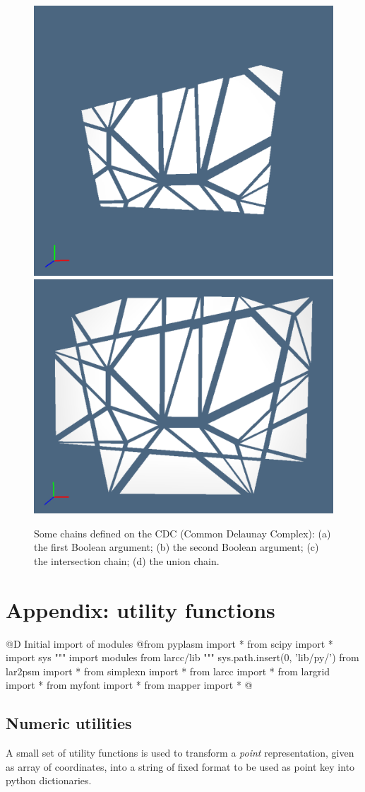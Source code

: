 \documentclass[11pt,oneside]{article}	%
\begin{document}
\begin{figure}[htbp]
   \includegraphics[height=0.2\linewidth,width=0.244\linewidth]{images/forks07} 
   \includegraphics[height=0.2\linewidth,width=0.244\linewidth]{images/forks08} 
   \caption{Some chains defined on the CDC (Common Delaunay Complex): (a) the first Boolean argument; (b) the second Boolean argument; (c) the intersection chain; (d) the union chain.}
   \label{fig:example}
\end{figure}


\appendix
\section{Appendix: utility functions}
@D Initial import of modules
@{from pyplasm import *
from scipy import *
import sys
""" import modules from larcc/lib """
sys.path.insert(0, 'lib/py/')
from lar2psm import *
from simplexn import *
from larcc import *
from largrid import *
from myfont import *
from mapper import *
@}
\subsection{Numeric utilities}

A small set of utility functions is used to transform a \emph{point} representation, given as array of coordinates, into a string of fixed format to be used as point key into python dictionaries.
\end{document}
